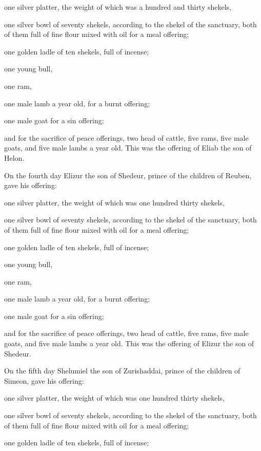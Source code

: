 one silver platter, the weight of which was a hundred and thirty
shekels,

one silver bowl of seventy shekels, according to the shekel of the
sanctuary, both of them full of fine flour mixed with oil for a meal
offering;

 one golden ladle of ten shekels, full of incense;

 one young bull,

one ram,

one male lamb a year old, for a burnt offering;

 one male goat for a sin offering;

 and for the sacrifice of peace offerings, two head of
cattle, five rams, five male goats, and five male lambs a year old. This
was the offering of Eliab the son of Helon.

 On the fourth day Elizur the son of Shedeur, prince of
the children of Reuben,  gave his offering:

one silver platter, the weight of which was one hundred thirty shekels,

one silver bowl of seventy shekels, according to the shekel of the
sanctuary, both of them full of fine flour mixed with oil for a meal
offering;

 one golden ladle of ten shekels, full of incense;

 one young bull,

one ram,

one male lamb a year old, for a burnt offering;

 one male goat for a sin offering;

 and for the sacrifice of peace offerings, two head of
cattle, five rams, five male goats, and five male lambs a year old. This
was the offering of Elizur the son of Shedeur.

 On the fifth day Shelumiel the son of Zurishaddai,
prince of the children of Simeon,  gave his offering:

one silver platter, the weight of which was one hundred thirty shekels,

one silver bowl of seventy shekels, according to the shekel of the
sanctuary, both of them full of fine flour mixed with oil for a meal
offering;

 one golden ladle of ten shekels, full of incense;

